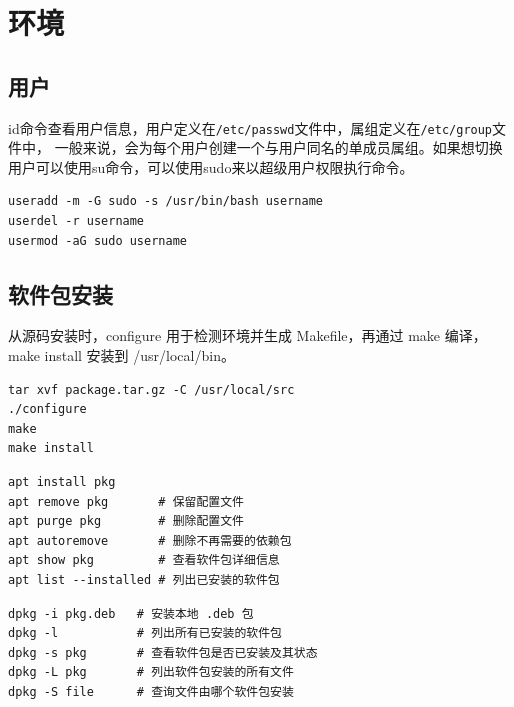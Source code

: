 \section{环境}
\subsection{用户}
id命令查看用户信息，用户定义在\texttt{/etc/passwd}文件中，属组定义在\texttt{/etc/group}文件中，
一般来说，会为每个用户创建一个与用户同名的单成员属组。如果想切换用户可以使用su命令，可以使用sudo来以超级用户权限执行命令。

\begin{code}[title=用户管理]
	\begin{verbatim}
useradd -m -G sudo -s /usr/bin/bash username
userdel -r username
usermod -aG sudo username
	\end{verbatim}
\end{code}

\subsection{软件包安装}
从源码安装时，configure 用于检测环境并生成 Makefile，再通过 make 编译，make install 安装到 /usr/local/bin。

\begin{code}[title=从源码安装]
	\begin{verbatim}
tar xvf package.tar.gz -C /usr/local/src
./configure
make
make install
	\end{verbatim}
\end{code}

\begin{code}[title=apt]
	\begin{verbatim}
apt install pkg
apt remove pkg       # 保留配置文件
apt purge pkg        # 删除配置文件
apt autoremove       # 删除不再需要的依赖包
apt show pkg         # 查看软件包详细信息
apt list --installed # 列出已安装的软件包
	\end{verbatim}
\end{code}

\begin{code}[title=dpkg]
	\begin{verbatim}
dpkg -i pkg.deb   # 安装本地 .deb 包
dpkg -l           # 列出所有已安装的软件包
dpkg -s pkg       # 查看软件包是否已安装及其状态
dpkg -L pkg       # 列出软件包安装的所有文件
dpkg -S file      # 查询文件由哪个软件包安装
	\end{verbatim}
\end{code}


